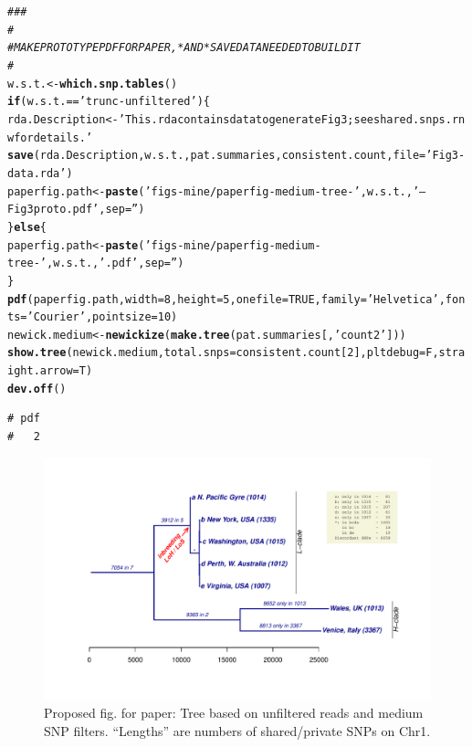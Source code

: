 \documentclass{article}\usepackage[]{graphicx}\usepackage[]{color}
\makeatletter
\newcommand{\hlnum}[1]{\textcolor[rgb]{0.686,0.059,0.569}{#1}}%
\newcommand{\hlstr}[1]{\textcolor[rgb]{0.192,0.494,0.8}{#1}}%
\newcommand{\hlcom}[1]{\textcolor[rgb]{0.678,0.584,0.686}{\textit{#1}}}%
\newcommand{\hlopt}[1]{\textcolor[rgb]{0,0,0}{#1}}%
\newcommand{\hlstd}[1]{\textcolor[rgb]{0.345,0.345,0.345}{#1}}%
\newcommand{\hlkwa}[1]{\textcolor[rgb]{0.161,0.373,0.58}{\textbf{#1}}}%
\newcommand{\hlkwb}[1]{\textcolor[rgb]{0.69,0.353,0.396}{#1}}%
\newcommand{\hlkwc}[1]{\textcolor[rgb]{0.333,0.667,0.333}{#1}}%
\newcommand{\hlkwd}[1]{\textcolor[rgb]{0.737,0.353,0.396}{\textbf{#1}}}%
\newenvironment{kframe}{%
 \def\at@end@of@kframe{}%
 \ifinner\ifhmode%
  \def\at@end@of@kframe{\end{minipage}}%
  \begin{minipage}{\columnwidth}%
 \fi\fi%
 \def\FrameCommand##1{\hskip\@totalleftmargin \hskip-\fboxsep
 \colorbox{shadecolor}{##1}\hskip-\fboxsep
     \hskip-\linewidth \hskip-\@totalleftmargin \hskip\columnwidth}%
 \MakeFramed {\advance\hsize-\width
   \@totalleftmargin\z@ \linewidth\hsize
   \@setminipage}}%
 {\par\unskip\endMakeFramed%
 \at@end@of@kframe}
\newenvironment{knitrout}{}{} %
\makeatother
\begin{document}
\begin{knitrout}\scriptsize
{}\color{fgcolor}\begin{kframe}
\begin{alltt}
\hlcom{###}
\hlcom{#}
\hlcom{# MAKE PROTOTYPE PDF FOR PAPER, *AND* SAVE DATA NEEDED TO BUILD IT}
\hlcom{#}
\hlstd{w.s.t.} \hlkwb{<-} \hlkwd{which.snp.tables}\hlstd{()}
\hlkwa{if}\hlstd{(w.s.t.} \hlopt{==} \hlstr{'trunc-unfiltered'}\hlstd{)\{}
  \hlstd{rda.Description} \hlkwb{<-} \hlstr{'This .rda contains data to generate Fig 3; see shared.snps.rnw for details.'}
  \hlkwd{save}\hlstd{(rda.Description, w.s.t., pat.summaries, consistent.count,} \hlkwc{file}\hlstd{=}\hlstr{'Fig3-data.rda'}\hlstd{)}
  \hlstd{paperfig.path} \hlkwb{<-} \hlkwd{paste}\hlstd{(}\hlstr{'figs-mine/paperfig-medium-tree-'}\hlstd{, w.s.t.,} \hlstr{'--Fig3proto.pdf'}\hlstd{,} \hlkwc{sep}\hlstd{=}\hlstr{''}\hlstd{)}
\hlstd{\}} \hlkwa{else} \hlstd{\{}
  \hlstd{paperfig.path} \hlkwb{<-} \hlkwd{paste}\hlstd{(}\hlstr{'figs-mine/paperfig-medium-tree-'}\hlstd{, w.s.t.,} \hlstr{'.pdf'}\hlstd{,} \hlkwc{sep}\hlstd{=}\hlstr{''}\hlstd{)}
\hlstd{\}}
\hlkwd{pdf}\hlstd{(paperfig.path,} \hlkwc{width}\hlstd{=}\hlnum{8}\hlstd{,}\hlkwc{height}\hlstd{=}\hlnum{5}\hlstd{,}\hlkwc{onefile}\hlstd{=}\hlnum{TRUE}\hlstd{,}\hlkwc{family}\hlstd{=}\hlstr{'Helvetica'}\hlstd{,}\hlkwc{fonts}\hlstd{=}\hlstr{'Courier'}\hlstd{,}\hlkwc{pointsize}\hlstd{=}\hlnum{10}\hlstd{)}
\hlstd{newick.medium} \hlkwb{<-} \hlkwd{newickize}\hlstd{(}\hlkwd{make.tree}\hlstd{(pat.summaries[,}\hlstr{'count2'}\hlstd{]))}
\hlkwd{show.tree}\hlstd{(newick.medium,} \hlkwc{total.snps}\hlstd{=consistent.count[}\hlnum{2}\hlstd{],} \hlkwc{pltdebug}\hlstd{=F,}\hlkwc{straight.arrow}\hlstd{=T)}
\hlkwd{dev.off}\hlstd{()}
\end{alltt}
\begin{verbatim}
# pdf 
#   2
\end{verbatim}
\end{kframe}
\end{knitrout}

\begin{figure}
  \hspace*{-1in}%
  \includegraphics{figs-mine/paperfig-medium-tree-Chr1-unfiltered.pdf}
  \caption{Proposed fig. for paper: Tree based on unfiltered reads and medium SNP filters.  ``Lengths'' are numbers of shared/private SNPs on Chr1.}
  \label{fig:tree-paper}
\end{figure}
\end{document}
